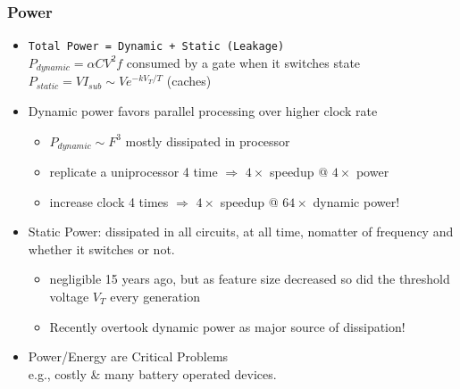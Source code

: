 \documentclass{beamer}
\newcommand{\emp}[1]{\textcolor{DikuRed}{ #1}}
\begin{document}
\begin{frame}[fragile,t]
\frametitle{Power}

\begin{itemize}
    \item \emp{\tt Total Power = Dynamic + Static (Leakage)}\\
                        $P_{dynamic} = \alpha C V^2 f$ 
                        consumed by a gate when it switches state\\
                        $P_{static}  = V I_{sub} \sim V e^{-k V_T / T}$ 
                        (caches)\medskip

    \item Dynamic power 
            favors parallel processing over higher clock rate
            \begin{itemize}
                \item $P_{dynamic} \sim F^3$ mostly dissipated in processor\pause
                \item replicate a uniprocessor 4 time $\Rightarrow$ 
                        $4\times$ speedup @ $4\times$ power
                \item increase clock 4 times $\Rightarrow$ 
                        $4\times$ speedup @ $64\times$ dynamic power!
            \end  {itemize}\medskip

    \item Static Power: dissipated in all circuits,  
                at all time, nomatter of frequency and whether
                it switches or not.
            \begin{itemize}
                \item negligible 15 years ago, but as feature size 
                        decreased so did the threshold voltage $V_T$ 
                        every generation
                \item \alert{Recently overtook dynamic power as major 
                        source of dissipation!}
            \end{itemize}\medskip

    \item \emp{Power/Energy are Critical Problems}\\ 
                e.g., costly \& many battery operated devices.
%
\end  {itemize}


\end{frame}
\end{document}
